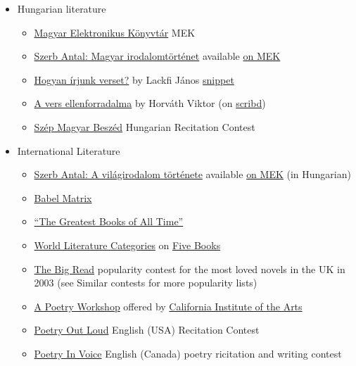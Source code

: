 \documentclass{article}
\begin{document}
\begin{itemize}
    \item Hungarian literature
    \begin{itemize}
        \item \href{https://mek.oszk.hu/}{Magyar Elektronikus Könyvtár} MEK
        \item \href{https://moly.hu/konyvek/szerb-antal-magyar-irodalomtortenet}{Szerb Antal: Magyar irodalomtörténet} available \href{https://mek.oszk.hu/14800/14871/}{on MEK}
        \item \href{https://moly.hu/konyvek/lackfi-janos-hogyan-irjunk-verset}{Hogyan írjunk verset?} by Lackfi János \href{https://olvassbele.com/2021/02/05/lackfi-janos-hogyan-irjunk-verset-reszlet/}{snippet}
        \item \href{https://moly.hu/konyvek/horvath-viktor-a-vers-ellenforradalma}{A vers ellenforradalma} by Horváth Viktor (on \href{https://www.scribd.com/book/342092705/A-vers-ellenforradalma-A-versiras-es-versforditas-tanulasa-es-tanitasa}{scribd})
        \item \href{https://szepmagyarbeszed.hu/}{Szép Magyar Beszéd} Hungarian Recitation Contest
    \end{itemize}
    \item International Literature
    \begin{itemize}
        \item \href{https://moly.hu/konyvek/szerb-antal-a-vilagirodalom-tortenete}{Szerb Antal: A világirodalom története} available \href{https://mek.oszk.hu/14800/14872/}{on MEK} (in Hungarian)
        \item \href{https://www.babelmatrix.org/}{Babel Matrix}
        \item \href{https://thegreatestbooks.org/}{``The Greatest Books of All Time''}
        \item \href{https://fivebooks.com/category/fiction/world-literature-books/}{World Literature Categories} on \href{https://fivebooks.com/}{Five Books}
        \item \href{https://en.wikipedia.org/wiki/The_Big_Read}{The Big Read} popularity contest for the most loved novels in the UK in 2003 (see Similar contests for more popularity lists) 
        \item \href{https://www.coursera.org/learn/poetry-workshop}{A Poetry Workshop} offered by \href{https://calarts.edu/}{California Institute of the Arts}
        \item \href{https://www.poetryoutloud.org/}{Poetry Out Loud} English (USA) Recitation Contest
        \item \href{https://www.poetryinvoice.com/}{Poetry In Voice} English (Canada) poetry ricitation and writing contest
    \end{itemize}
\end{itemize}
\end{document}
